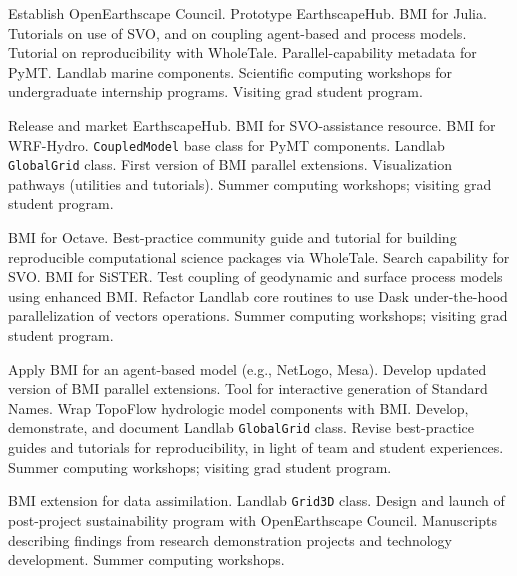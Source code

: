  Establish OpenEarthscape Council. Prototype  EarthscapeHub. BMI for Julia. Tutorials on use of SVO, and on coupling agent-based and process models. Tutorial on reproducibility with WholeTale. Parallel-capability metadata for PyMT. Landlab marine components. Scientific computing workshops for undergraduate internship programs. Visiting grad student program.

 Release and market EarthscapeHub. BMI for  SVO-assistance resource. BMI for  WRF-Hydro. \texttt{CoupledModel} base class for PyMT components. Landlab \texttt{GlobalGrid} class. First version of BMI parallel extensions. Visualization pathways (utilities and  tutorials). Summer  computing workshops; visiting grad student program.

 BMI for Octave. Best-practice community guide and tutorial for building reproducible computational science packages via WholeTale. Search capability for SVO. BMI for SiSTER. Test coupling of geodynamic and surface process models using enhanced BMI. Refactor Landlab core routines to use Dask under-the-hood parallelization of vectors operations. Summer  computing workshops; visiting grad student program.

Apply BMI for an agent-based model (e.g., NetLogo, Mesa). Develop updated version of BMI parallel extensions. Tool for interactive generation of Standard Names. Wrap TopoFlow hydrologic model components with BMI. Develop, demonstrate, and document Landlab \texttt{GlobalGrid} class. Revise best-practice guides and tutorials for reproducibility, in light of team and student experiences. Summer  computing workshops; visiting grad student program.

BMI extension for data assimilation. Landlab \texttt{Grid3D} class. Design and launch of post-project sustainability program with OpenEarthscape Council. Manuscripts describing findings from research demonstration projects and technology development. Summer  computing workshops.

